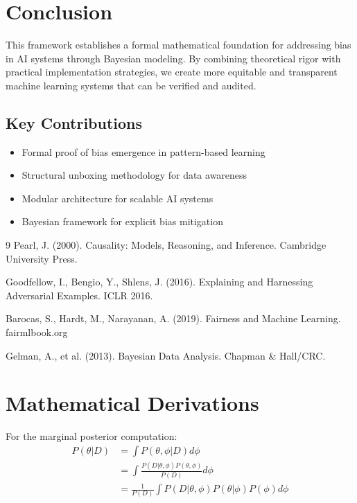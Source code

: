 \documentclass[11pt,a4paper]{article}
\begin{document}
\section{Conclusion}

This framework establishes a formal mathematical foundation for addressing bias in AI systems through Bayesian modeling. By combining theoretical rigor with practical implementation strategies, we create more equitable and transparent machine learning systems that can be verified and audited.

\subsection{Key Contributions}
\begin{itemize}
    \item Formal proof of bias emergence in pattern-based learning
    \item Structural unboxing methodology for data awareness
    \item Modular architecture for scalable AI systems
    \item Bayesian framework for explicit bias mitigation
\end{itemize}

\begin{thebibliography}{9}
Pearl, J. (2000). Causality: Models, Reasoning, and Inference. Cambridge University Press.

Goodfellow, I., Bengio, Y., Shlens, J. (2016). Explaining and Harnessing Adversarial Examples. ICLR 2016.

Barocas, S., Hardt, M., Narayanan, A. (2019). Fairness and Machine Learning. fairmlbook.org

Gelman, A., et al. (2013). Bayesian Data Analysis. Chapman \& Hall/CRC.
\end{thebibliography}

\appendix

\section{Mathematical Derivations}

For the marginal posterior computation:
\begin{align}
P(\theta|D) &= \int P(\theta,\phi|D)d\phi\\
&= \int \frac{P(D|\theta,\phi)P(\theta,\phi)}{P(D)}d\phi\\
&= \frac{1}{P(D)}\int P(D|\theta,\phi)P(\theta|\phi)P(\phi)d\phi
\end{align}
\end{document}
